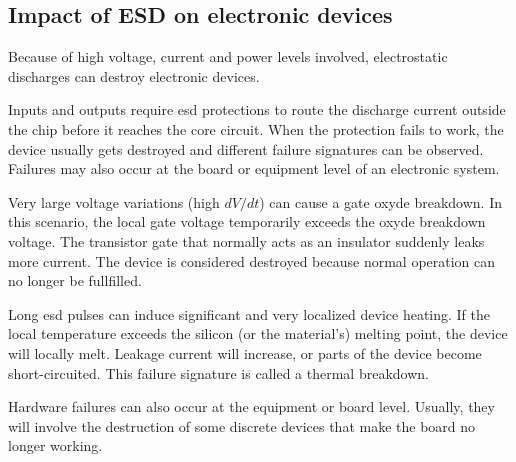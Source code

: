 \subsection{Impact of ESD on electronic devices}


Because of high voltage, current and power levels involved, electrostatic discharges can destroy electronic devices.

Inputs and outputs require \gls{esd} protections to route the discharge current outside the chip before it reaches the core circuit.
When the protection fails to work, the device usually gets destroyed and different failure signatures can be observed.
Failures may also occur at the board or equipment level of an electronic system.

Very large voltage variations (high $dV/dt$) can cause a gate oxyde breakdown.
In this scenario, the local gate voltage temporarily exceeds the oxyde breakdown voltage.
The transistor gate that normally acts as an insulator suddenly leaks more current.
The device is considered destroyed because normal operation can no longer be fullfilled.

Long \gls{esd} pulses can induce significant and very localized device heating.
If the local temperature exceeds the silicon (or the material's) melting point, the device will locally melt.
Leakage current will increase, or parts of the device become short-circuited.
This failure signature is called a thermal breakdown.

Hardware failures can also occur at the equipment or board level.
Usually, they will involve the destruction of some discrete devices that make the board no longer working.


